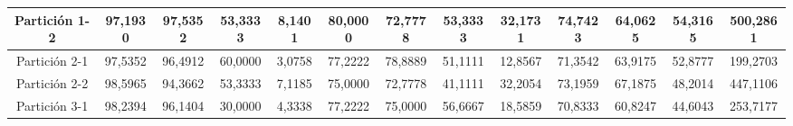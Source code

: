 \documentclass[12pt]{article}
\begin{document}
\begin{table}[H]
{\begin{tabular}{|c|cccc|cccc|cccc|}
Partición 1-2 & \multicolumn{1}{c|}{97,1930}                                                  & \multicolumn{1}{c|}{97,5352}                                                 & \multicolumn{1}{c|}{53,3333} & 8,1401 & \multicolumn{1}{c|}{80,0000}                                                  & \multicolumn{1}{c|}{72,7778}                                                 & \multicolumn{1}{c|}{53,3333} & 32,1731 & \multicolumn{1}{c|}{74,7423}                                                  & \multicolumn{1}{c|}{64,0625}                                                 & \multicolumn{1}{c|}{54,3165} & 500,2861 \\ \hline
Partición 2-1 & \multicolumn{1}{c|}{97,5352}                                                  & \multicolumn{1}{c|}{96,4912}                                                 & \multicolumn{1}{c|}{60,0000} & 3,0758 & \multicolumn{1}{c|}{77,2222}                                                  & \multicolumn{1}{c|}{78,8889}                                                 & \multicolumn{1}{c|}{51,1111} & 12,8567 & \multicolumn{1}{c|}{71,3542}                                                  & \multicolumn{1}{c|}{63,9175}                                                 & \multicolumn{1}{c|}{52,8777} & 199,2703 \\ \hline
Partición 2-2 & \multicolumn{1}{c|}{98,5965}                                                  & \multicolumn{1}{c|}{94,3662}                                                 & \multicolumn{1}{c|}{53,3333} & 7,1185 & \multicolumn{1}{c|}{75,0000}                                                  & \multicolumn{1}{c|}{72,7778}                                                 & \multicolumn{1}{c|}{41,1111} & 32,2054 & \multicolumn{1}{c|}{73,1959}                                                  & \multicolumn{1}{c|}{67,1875}                                                 & \multicolumn{1}{c|}{48,2014} & 447,1106 \\ \hline
Partición 3-1 & \multicolumn{1}{c|}{98,2394}                                                  & \multicolumn{1}{c|}{96,1404}                                                 & \multicolumn{1}{c|}{30,0000} & 4,3338 & \multicolumn{1}{c|}{77,2222}                                                  & \multicolumn{1}{c|}{75,0000}                                                 & \multicolumn{1}{c|}{56,6667} & 18,5859 & \multicolumn{1}{c|}{70,8333}                                                  & \multicolumn{1}{c|}{60,8247}                                                 & \multicolumn{1}{c|}{44,6043} & 253,7177 \\ \hline

\end{tabular}}
\end{table}
\end{document}
